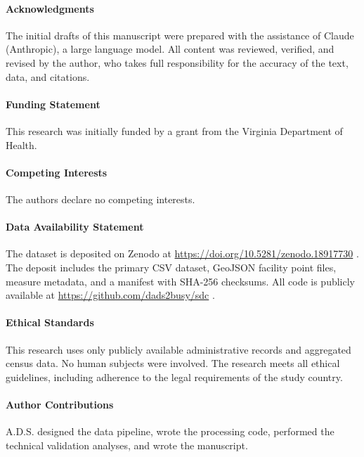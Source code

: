 \documentclass{CUP-JNL-DAP}%
\begin{document}
\begin{Backmatter}

\paragraph{Acknowledgments}
The initial drafts of this manuscript were prepared with the assistance of Claude (Anthropic), a large language model. All content was reviewed, verified, and revised by the author, who takes full responsibility for the accuracy of the text, data, and citations.

\paragraph{Funding Statement}
This research was initially funded by a grant from the Virginia Department of Health.

\paragraph{Competing Interests}
The authors declare no competing interests.

\paragraph{Data Availability Statement}
The dataset is deposited on Zenodo at \url{https://doi.org/10.5281/zenodo.18917730} \citep{zenodo_dataset}. The deposit includes the primary CSV dataset, GeoJSON facility point files, measure metadata, and a manifest with SHA-256 checksums. All code is publicly available at \url{https://github.com/dads2busy/sdc} \citep{sdccore}.

\paragraph{Ethical Standards}
This research uses only publicly available administrative records and aggregated census data. No human subjects were involved. The research meets all ethical guidelines, including adherence to the legal requirements of the study country.

\paragraph{Author Contributions}
A.D.S. designed the data pipeline, wrote the processing code, performed the technical validation analyses, and wrote the manuscript.



\end{Backmatter}
\end{document}
